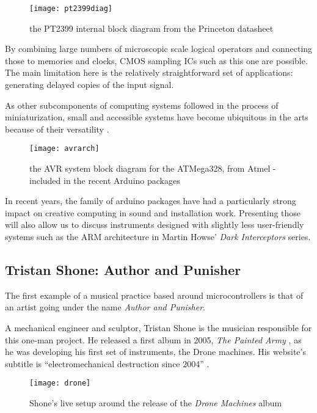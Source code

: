 	\begin{figure}[h!]
	  \caption{the PT2399 internal block diagram from the Princeton datasheet}
	  \centering
	    \texttt{[image: pt2399diag]}
	\end{figure}

By combining large numbers of microscopic scale logical operators and connecting those to memories and clocks, CMOS sampling ICs such as this one are possible. The main limitation here is the relatively straightforward set of applications: generating delayed copies of the input signal. 

As other subcomponents of computing systems followed in the process of miniaturization, small and accessible systems have become ubiquitous in the arts because of their versatility \citep{gibb2010}.

	\begin{figure}[h!]
	  \caption{the AVR system block diagram for the ATMega328, from Atmel - included in the recent Arduino packages}
	  \centering
	    \texttt{[image: avrarch]}
	\end{figure}

In recent years, the family of arduino packages have had a particularly strong impact on creative computing in sound and installation work. Presenting those will also allow us to discuss instruments designed with slightly less user-friendly systems such as the ARM architecture in Martin Howse' \emph{Dark Interceptors} series.  

 

\subsection{Tristan Shone: Author and Punisher}

The first example of a musical practice based around microcontrollers is that of an artist going under the name \emph{Author and Punisher}. 

A mechanical engineer and sculptor, Tristan Shone is the musician responsible for this one-man project. He released a first album in 2005, \emph{The Painted Army} \citep{shone,2005}, as he was developing his first set of instruments, the Drone machines. His website's subtitle is ``electromechanical destruction since 2004'' \citep{shone2004}.

	\begin{figure}[h!]
	  \caption{Shone's live setup around the release of the \emph{Drone Machines} album}
	  \centering
	    \texttt{[image: drone]}
	\end{figure}
	
